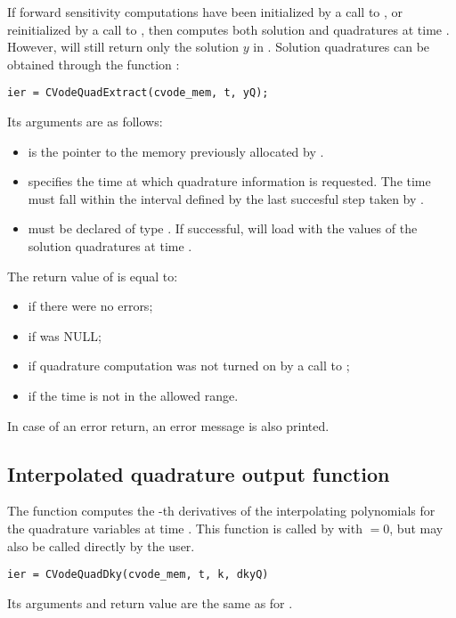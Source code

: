 If forward sensitivity computations have been initialized by a call to ,
or reinitialized by a call to , then {\cvodes} computes both solution
and quadratures at time . However,  will still return only the solution
$y$ in . Solution quadratures can be obtained through the function
:
\begin{verbatim}
ier = CVodeQuadExtract(cvode_mem, t, yQ);
\end{verbatim}
Its arguments are as follows:
\begin{itemize}
\item {} is the pointer to the memory previously allocated
  by .
\item {} specifies the time at which quadrature information is 
  requested. The time  must fall within the interval defined by the last 
  succesful step taken by {\cvodes}.
\item {} must be declared of type .
  If successful,  will load  with the values of the
  solution quadratures at time .
\end{itemize}
The return value  of  is equal to: 
\begin{itemize}
\item {} if there were no errors; 
\item {} if  was NULL;
\item {} if quadrature computation was not turned on
      by a call to ;
\item {} if the time  is not in the allowed range.
\end{itemize}
In case of an error return, an error message is also printed.  


\subsection{Interpolated quadrature output function}

The function  computes the -th derivatives of the interpolating 
polynomials for the quadrature variables at time .
This function is called by  with  $= 0$, but may also be called 
directly by the user.
\begin{verbatim}
ier = CVodeQuadDky(cvode_mem, t, k, dkyQ)
\end{verbatim}
Its arguments and return value are the same as for .

